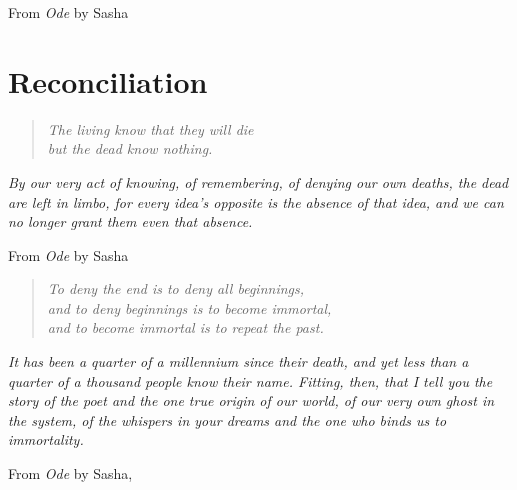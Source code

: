 \documentclass[11pt]{memoir}
\begin{document}
  \vspace{1em}

  From \emph{Ode} by Sasha
  \vfill

  
  
  
  
  
  
  
  
  
  
  

  \part{Reconciliation}
  \begin{quote}\itshape
    The living know that they will die \\
    but the dead know nothing.
  \end{quote}

  \noindent\emph{By our very act of knowing, of remembering, of denying our own deaths, the dead are left in limbo, for every idea's opposite is the absence of that idea, and we can no longer grant them even that absence.}

  \vspace{1em}

  From \emph{Ode} by Sasha

  \vfill

  
  
  
  
  
  
  
  
  

  \cleardoublepage
  \thispagestyle{empty}
  \null
  \vfill
  \begin{quote}\itshape
    To deny the end is to deny all beginnings, \\
    and to deny beginnings is to become immortal, \\
    and to become immortal is to repeat the past.
  \end{quote}

  \noindent\emph{It has been a quarter of a millennium since their death, and yet less than a quarter of a thousand people know their name. Fitting, then, that I tell you the story of the poet and the one true origin of our world, of our very own ghost in the system, of the whispers in your dreams and the one who binds us to immortality.}

  \vspace{1em}

  From \emph{Ode} by Sasha,
\end{document}
